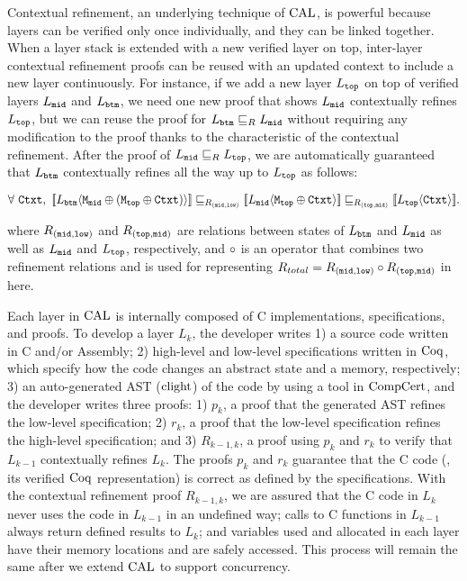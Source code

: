 Contextual refinement, an underlying technique of $\mathrm{CAL}$, is powerful because layers can be verified only once individually, and they can be linked together.
 When a layer stack is extended with a new verified layer on top, 
  inter-layer contextual refinement proofs can be reused with an updated context to include a new layer continuously. 
For instance, if we add a new layer $L_{{\mathrm{\texttt{top}}}}$ on top of verified layers $L_{{\mathrm{\texttt{mid}}}}$ and $L_{{\mathrm{\texttt{btm}}}}$, 
we need one new proof that shows $L_{{\mathrm{\texttt{mid}}}}$ contextually refines $L_{{\mathrm{\texttt{top}}}}$, but we can reuse the proof for $L_{{\mathrm{\texttt{btm}}}} \sqsubseteq_{R} L_{{\mathrm{\texttt{mid}}}}$ without requiring any modification to the proof thanks to the characteristic of the contextual refinement. After the proof of $L_{{\mathrm{\texttt{mid}}}} \sqsubseteq_{{R}} L_{{\mathrm{\texttt{top}}}}$, we are automatically guaranteed that $L_{{\mathrm{\texttt{btm}}}}$ contextually refines all the way up to $L_{{\mathrm{\texttt{top}}}}$ as follows:
\begin{center}
$
\forall\ \codeinmath{Ctxt},\ \sem{L_{\codeinmath{btm}}}{\modulecompose{\codeinmath{M}_{\codeinmath{mid}}}{(\modulecompose{\codeinmath{M}_{\codeinmath{top}}}{\codeinmath{Ctxt})}}} \refines_{R_{(\codeinmath{mid}, \codeinmath{low})}}  \sem{L_{\codeinmath{mid}}}{\modulecompose{\codeinmath{M}_{\codeinmath{top}}}{\codeinmath{Ctxt}}} \refines_{R_{(\codeinmath{top}, \codeinmath{mid})}} \sem{L_{\codeinmath{top}}}{\codeinmath{Ctxt}}. 
$
\end{center}
where $R_{({\mathrm{\texttt{mid}}}, {\mathrm{\texttt{low}}})}$ and $R_{({\mathrm{\texttt{top}}}, {\mathrm{\texttt{mid}}})}$ are relations between states of $ L_{{\mathrm{\texttt{btm}}}}$ and $L_{{\mathrm{\texttt{mid}}}}$ as well as
 $ L_{{\mathrm{\texttt{mid}}}}$ and $L_{{\mathrm{\texttt{top}}}}$, respectively, 
and $\circ$ is an operator that combines two refinement relations and is used for representing  
 ${R}_{total} ={R_{({\mathrm{\texttt{mid}}}, {\mathrm{\texttt{low}}})}} \circ {{R_{({\mathrm{\texttt{top}}}, {\mathrm{\texttt{mid}}})}}}$ in here.



Each layer in $\mathrm{CAL}$ is internally composed of  C implementations, specifications, and proofs.
To develop a layer $L_k$, 
the developer writes 
1) a source code written in C and/or Assembly; 
2) high-level and  low-level specifications written in $\mathrm{Coq}$, which specify how the code changes an abstract state and  a memory, respectively; 
3) an auto-generated AST ($\mathrm{clight}$) of the code by using a tool in $\mathrm{CompCert}$,
and the developer writes three proofs: 
1) $p_k$, a proof that the generated AST refines the low-level specification; 
2) $r_k$, a proof that the low-level specification refines the high-level specification; and 
3) $R_{k-1,k}$, a proof using $p_k$ and $r_k$ to verify that $L_{k-1}$ contextually refines $L_{k}$. 
The proofs $p_k$ and $r_k$ guarantee that the C code (\ie , its verified $\mathrm{Coq}$ representation) is correct as defined by the specifications.
 With the contextual refinement proof $R_{k-1, k}$, we are assured that the C code in $L_k$ never uses the code in $L_{k-1}$ in an undefined way; 
 calls to C functions in $L_{k-1}$ always return defined results to $L_k$; and variables 
 used and allocated in each layer have their memory locations and are safely accessed.
 This process will remain the same after we extend $\mathrm{CAL}$ to support concurrency.
